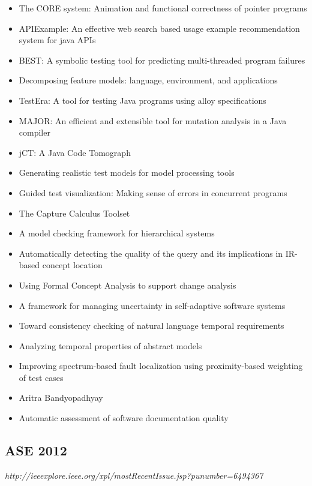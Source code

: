 {\begin{itemize}[itemsep=-1ex]
  \item The CORE system: Animation and functional correctness of pointer programs
  \item APIExample: An effective web search based usage example recommendation system for java APIs
  \item BEST: A symbolic testing tool for predicting multi-threaded program failures
  \item Decomposing feature models: language, environment, and applications
  \item TestEra: A tool for testing Java programs using alloy specifications
  \item MAJOR: An efficient and extensible tool for mutation analysis in a Java compiler
  \item jCT: A Java Code Tomograph
  \item Generating realistic test models for model processing tools
  \item Guided test visualization: Making sense of errors in concurrent programs
  \item The Capture Calculus Toolset
  \item A model checking framework for hierarchical systems
  \item Automatically detecting the quality of the query and its implications in IR-based concept location
  \item Using Formal Concept Analysis to support change analysis
  \item A framework for managing uncertainty in self-adaptive software systems
  \item Toward consistency checking of natural language temporal requirements
  \item Analyzing temporal properties of abstract models
  \item Improving spectrum-based fault localization using proximity-based weighting of test cases
  \item Aritra Bandyopadhyay
  \item Automatic assessment of software documentation quality
\end{itemize}
}

\subsection{ASE 2012}

{\small \em http://ieeexplore.ieee.org/xpl/mostRecentIssue.jsp?punumber=6494367}

